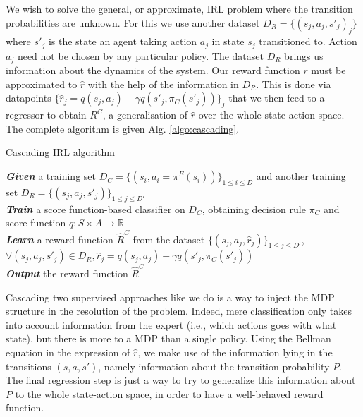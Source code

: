 \documentclass[smallextended]{svjour3}
\begin{document}
We wish to solve the general, or approximate, IRL problem where the transition probabilities are unknown. For this we use another dataset $D_R = \{(s_j,a_j,s'_j)_j\}$ where $s'_j$ is the state an agent taking action $a_j$ in state $s_j$ transitioned to. Action $a_j$ need not be chosen by any particular policy. The dataset $D_R$ brings us information about the dynamics of the system. Our reward function $r$ must be approximated to $\hat r$ with the help of the information in $D_R$. This is done via datapoints $\{\hat r_j = q(s_j,a_j) - \gamma q(s'_j,\pi_C(s'_j))\}_j$ that we then feed to a regressor \cite{vapnik1996nature} to obtain $R^C$, a generalisation of $\hat r$ over the whole state-action space. The complete algorithm is given Alg. \ref{algo:cascading}.
\begin{algorithm}%
  \caption{Cascading IRL algorithm}
  \label{algo:cascading}
  \emph{\textbf{Given}} a training set $D_C=\{(s_i,a_i=\pi^E(s_i))\}_{1\leq i \leq D}$ and another training set $D_R=\{(s_{j},a_{j},s'_{j})\}_{1\leq j \leq D'}$\;\\
  \emph{\textbf{Train}} a score function-based classifier on $D_C$, obtaining decision rule $\pi_C$ and score function $q:S\times A \rightarrow \mathbb R$\;\\
  \emph{\textbf{Learn}} a reward function $\hat R^C$ from the dataset $\{(s_{j},a_{j},\hat{r}_j)\}_{1\leq j \leq D'}$, $\forall (s_j,a_j,s'_j) \in D_R,\hat{r}_j=q(s_{j},a_{j})-\gamma q(s'_{j},\pi_C(s'_{j}))$\;\\
  \emph{\textbf{Output}} the reward function $\hat R^{C}$ \;
\end{algorithm}

Cascading two supervised approaches like we do is a way to inject the MDP structure in the resolution of the problem. Indeed, mere classification only takes into account information from the expert (i.e., which actions goes with what state), but there is more to a MDP than a single policy. Using the Bellman equation in the expression of $\hat r$, we make use of the information lying in the transitions $(s,a,s')$, namely information about the transition probability $P$. The final regression step is just a way to try to generalize this information about $P$ to the whole state-action space, in order to have a well-behaved reward function.
\end{document}
